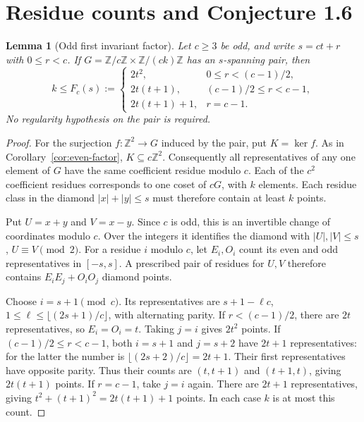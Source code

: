 \documentclass[11pt]{article}
\newtheorem{lemma}[theorem]{Lemma}
\newcommand{\Z}{\mathbb Z}
\begin{document}
\section{Residue counts and Conjecture 1.6}
\begin{lemma}[Odd first invariant factor]\label{lem:odd-factor}
Let $c\ge3$ be odd, and write $s=ct+r$ with $0\le r<c$.
If $G=\Z/c\Z\times\Z/(ck)\Z$ has an $s$-spanning pair, then
\[
k\le F_c(s):=
\begin{cases}
2t^2,&0\le r<(c-1)/2,\\
2t(t+1),&(c-1)/2\le r<c-1,\\
2t(t+1)+1,&r=c-1.
\end{cases}
\]
No regularity hypothesis on the pair is required.
\end{lemma}
\begin{proof}
For the surjection $f:\Z^2\to G$ induced by the pair, put $K=\ker f$.
As in Corollary~\ref{cor:even-factor}, $K\subseteq c\Z^2$.
Consequently all representatives of any one element of $G$ have the
same coefficient residue modulo $c$. Each of the $c^2$ coefficient
residues corresponds to one coset of $cG$, with $k$ elements.
Each residue class in the diamond $|x|+|y|\le s$ must therefore
contain at least $k$ points.

Put $U=x+y$ and $V=x-y$. Since $c$ is odd, this is an invertible
change of coordinates modulo $c$. Over the integers it identifies
the diamond with $|U|,|V|\le s$, $U\equiv V\pmod2$.
For a residue $i$ modulo $c$, let $E_i,O_i$ count its even and odd
representatives in $[-s,s]$. A prescribed pair of residues for $U,V$
therefore contains $E_iE_j+O_iO_j$ diamond points.

Choose $i=s+1\pmod c$. Its representatives are $s+1-\ell c$,
$1\le\ell\le\lfloor(2s+1)/c\rfloor$, with alternating parity.
If $r<(c-1)/2$, there are $2t$ representatives, so $E_i=O_i=t$.
Taking $j=i$ gives $2t^2$ points.
If $(c-1)/2\le r<c-1$, both $i=s+1$ and $j=s+2$ have $2t+1$
representatives: for the latter the number is
$\lfloor(2s+2)/c\rfloor=2t+1$.
Their first representatives have opposite parity. Thus their counts
are $(t,t+1)$ and $(t+1,t)$, giving $2t(t+1)$ points.
If $r=c-1$, take $j=i$ again. There are $2t+1$ representatives, giving
$t^2+(t+1)^2=2t(t+1)+1$ points. In each case $k$ is at most this count.
\end{proof}
\end{document}
